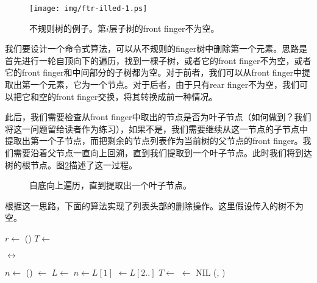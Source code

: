 \documentclass[UTF8]{article}
\begin{document}
\begin{figure}[htbp]
  \centering
  \texttt{[image: img/ftr-illed-1.ps]}
  \caption{不规则树的例子。第$i$层子树的front finger不为空。} \label{fig:ftr-illed-form}
\end{figure}

我们要设计一个命令式算法，可以从不规则的finger树中删除第一个元素。思路是首先进行一轮自顶向下的遍历，找到一棵子树，或者它的front finger不为空，或者它的front finger和中间部分的子树都为空。对于前者，我们可以从front finger中提取出第一个元素，它为一个节点。对于后者，由于只有rear finger不为空，我们可以把它和空的front finger交换，将其转换成前一种情况。

此后，我们需要检查从front finger中取出的节点是否为叶子节点（如何做到？我们将这一问题留给读者作为练习），如果不是，我们需要继续从这一节点的子节点中提取出第一个子节点，而把剩余的节点列表作为当前树的父节点的front finger。我们需要沿着父节点一直向上回溯，直到我们提取到一个叶子节点。此时我们将到达树的根节点。图\ref{fig:ftr-illed-extract}描述了这一过程。

\begin{figure}[htbp]
  \centering
  \caption{自底向上遍历，直到提取出一个叶子节点。} \label{fig:ftr-illed-extract}
\end{figure}

根据这一思路，下面的算法实现了列表头部的删除操作。这里假设传入的树不为空。

\begin{algorithmic}
  \State $r \gets$ ()
  \State {}
    \State $T \gets$ 
  \EndWhile

    \State {}  $\leftrightarrow$ 
  \EndIf

  \State $n \gets $ ()
  \State {} $\gets$ 
  \Repeat
    \State $L \gets$  
    \State $n \gets L[1]$ 
    \State {} $\gets L[2..]$ 
    \State $T \gets $ 
      \State {} $\gets$ NIL
    \EndIf
  \State \Return (, )
\EndFunction
\end{algorithmic}
\end{document}
